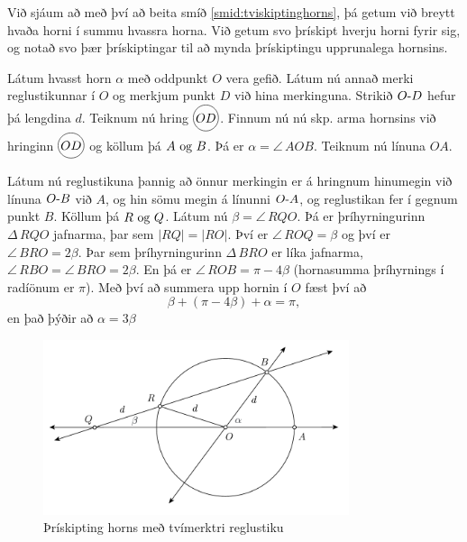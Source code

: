 \begin{frame}
  Við sjáum að með því að beita smíð \ref{smid:tviskiptinghorns}, þá getum við
  breytt hvaða horni í summu hvassra horna. Við getum svo þrískipt hverju horni fyrir
  sig, og notað svo þær þrískiptingar til að mynda þrískiptingu upprunalega hornsins.
\end{frame}

\begin{frame}[allowframebreaks]
  \begin{smid}
    \label{smid:thriskipting}
    Látum hvasst horn \(\alpha\)
    með oddpunkt \(O\)
    vera gefið. Látum nú annað merki reglustikunnar í \(O\)
    og merkjum punkt \(D\)
    við hina merkinguna. Strikið \(\lin{O}{D}\)
    hefur þá lengdina \(d\).
    Teiknum nú hring \(\hri{OD}\).
    Finnum nú nú skp. arma hornsins við hringinn \(\hri{OD}\)
    og köllum þá
    \(A \Og B\). Þá er \(\alpha = \angle\, AOB\). Teiknum nú línuna \(OA\).

    \theorembreak
    
    Látum nú reglustikuna þannig að önnur merkingin er á hringnum hinumegin
    við línuna \(\lin{O}{B}\) við \(A\), og hin sömu megin á línunni \(\lin{O}{A}\),
    og reglustikan fer í gegnum punkt \(B\). Köllum þá \(R \Og Q\). Látum nú
    \(\beta = \angle\, RQO\). Þá er þríhyrningurinn \(\Delta\, RQO\) jafnarma,
    þar sem \(|RQ| = |RO|\). Því er \(\angle\, ROQ = \beta\) og því er
    \(\angle\, BRO = 2 \beta\). Þar sem þríhyrningurinn \(\Delta\, BRO\)
    er líka jafnarma, \(\angle\, RBO = \angle\, BRO = 2\beta\). En þá er
    \(\angle\, ROB = \pi - 4\beta\) (hornasumma þríhyrnings í radíönum er \(\pi\)).
    Með því að summera upp hornin í \(O\) fæst því að
    \[ \beta + (\pi - 4\beta) + \alpha = \pi,\]
    en það þýðir að \(\alpha = 3\beta\)
  \end{smid}
\end{frame}

\begin{frame}
  \begin{figure}[H]
    \centering
    \includegraphics[width=0.8\textwidth]{TwiceNotched.png}
    \caption{Þrískipting horns með tvímerktri reglustiku}
    \label{fig:thriskipt}
  \end{figure}
\end{frame}

